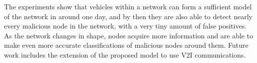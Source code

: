 \documentclass[conference]{IEEEtran}
\begin{document}
The experiments show that vehicles within a network can form a sufficient model of the network in around one day, and by then they are also able to detect nearly every malicious node in the network, with a very tiny amount of false positives.
As the network changes in shape, nodes acquire more information and are able to make even more accurate classifications of malicious nodes around them. Future work includes the extension of the proposed model to use V2I communications.



%
%









%
%
%




\end{document}
